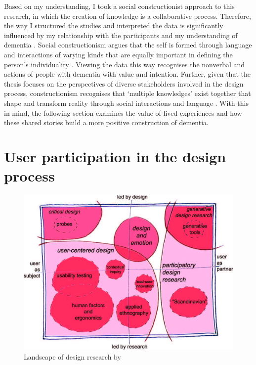 Based on my understanding, I took a social constructionist approach to this research, in which the creation of knowledge is a collaborative process. Therefore, the way I structured the studies and interpreted the data is significantly influenced by my relationship with the participants and my understanding of dementia \citep{surr2006preservation}. Social constructionism argues that the self is formed through language and interactions of varying kinds that are equally important in defining the person's individuality \citep{sarup1996identity}. Viewing the data this way recognises the nonverbal and actions of people with dementia with value and intention. Further, given that the thesis focuses on the perspectives of diverse stakeholders involved in the design process, constructionism recognises that `multiple knowledges' exist together that shape and transform reality through social interactions and language \citep{mckeown2015you}. With this in mind, the following section examines the value of lived experiences and how these shared stories build a more positive construction of dementia.

\section{User participation in the design process}
\label{ParticipationDesignProcess}

\begin{figure}[htp]
    \centering
    \includegraphics[width=0.6\linewidth]{Images/Methodology/Landscape_of_Design.jpg}
    \caption{Landscape of design research by  \citep{sanders2008co}}
    \label{fig:LandscapeOfDesign}
\end{figure}

